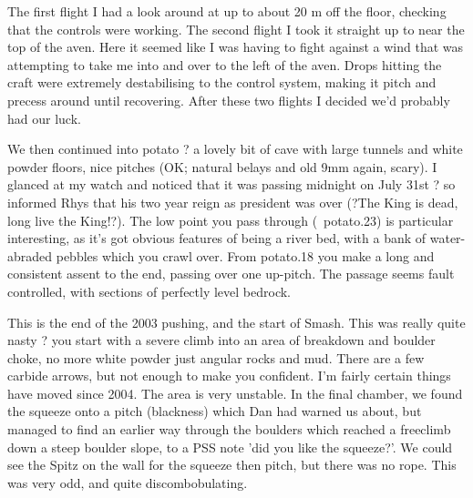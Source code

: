 The first flight I had a look around at up to about 20 m off the floor, checking that the controls were working. The second flight I took it straight up to near the top of the aven. Here it seemed like I was having to fight against a wind that was attempting to take me into and over to the left of the aven. Drops hitting the craft were extremely destabilising to the control system, making it pitch and precess around until recovering. After these two flights I decided we'd probably had our luck.

We then continued into potato ? a lovely bit of cave with large tunnels and white powder floors, nice pitches (OK; natural belays and old 9mm again, scary). I glanced at my watch and noticed that it was passing midnight on July 31st ? so informed Rhys that his two year reign as president was over (?The King is dead, long live the King!?).
The low point you pass through (~potato.23) is particular interesting, as it's got obvious features of being a river bed, with a bank of water-abraded pebbles which you crawl over.
From potato.18 you make a long and consistent assent to the end, passing over one up-pitch. The passage seems fault controlled, with sections of perfectly level bedrock.


This is the end of the 2003 pushing, and the start of Smash. This was really quite nasty ? you start with a severe climb into an area of breakdown and boulder choke, no more white powder just angular rocks and mud. There are a few carbide arrows, but not enough to make you confident. I'm fairly certain things have moved since 2004. The area is very unstable. In the final chamber, we found the squeeze onto a pitch (blackness) which Dan had warned us about, but managed to find an earlier way through the boulders which reached a freeclimb down a steep boulder slope, to a PSS note 'did you like the squeeze?'. We could see the Spitz on the wall for the squeeze then pitch, but there was no rope. This was very odd, and quite discombobulating.


